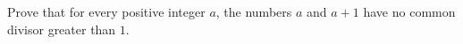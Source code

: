 Prove that for every positive integer $a$, the numbers $a$ and $a+1$ have no common divisor greater than $1$.
